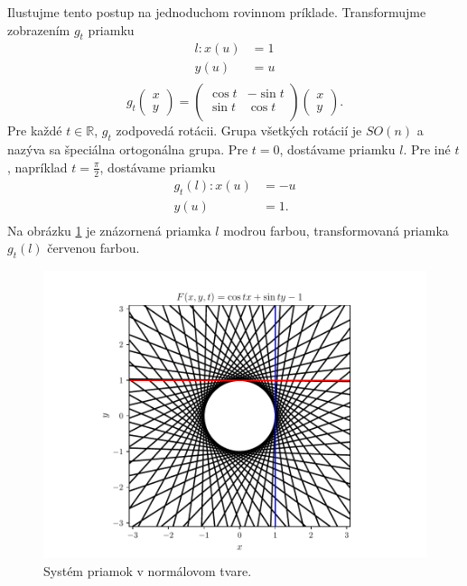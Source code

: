 \begin{example}
Ilustujme tento postup na jednoduchom rovinnom príklade. Transformujme zobrazením $g_t$ priamku
\begin{align*}
l \colon x(u) &= 1 \\
y(u) &= u \\
\end{align*}
\[
g_t \begin{pmatrix} x \\ y \end{pmatrix} = \begin{pmatrix}
\cos t & -\sin t  \\
\sin t & \cos t  \\
\end{pmatrix}
\begin{pmatrix} x \\ y \end{pmatrix}.
\]
Pre každé $t \in \mathbb{R}$, $g_t$ zodpovedá rotácii. Grupa všetkých rotácií je $SO(n)$ a nazýva sa špeciálna ortogonálna grupa. Pre $t = 0$, dostávame priamku $l$. Pre iné $t$, napríklad $t = \frac{\pi}{2}$, dostávame priamku
\begin{align*}
g_t(l) \colon x(u) &= -u \\
y(u) &= 1. \\
\end{align*}
Na obrázku \ref{fig:lines_in_normal_form} je znázornená priamka $l$ modrou farbou, transformovaná priamka $g_t(l)$ červenou farbou.

\begin{figure}[H]
	\centering
	\includegraphics{images/lines_in_normal_form.pdf}
	\caption{Systém priamok v normálovom tvare.}
	\label{fig:lines_in_normal_form}
\end{figure}

\end{example}

